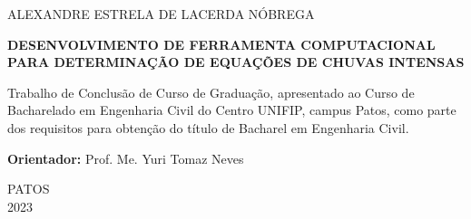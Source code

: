 \thispagestyle{empty}
	
	\begin{center}
		ALEXANDRE ESTRELA DE LACERDA NÓBREGA
	\end{center}
	
	\vspace{3.5cm}
	
	\begin{center}
		{\large \textbf{DESENVOLVIMENTO DE FERRAMENTA COMPUTACIONAL PARA DETERMINAÇÃO DE EQUAÇÕES DE CHUVAS INTENSAS}}
	\end{center}
	
	\vspace{4cm}
	
	\begin{quoting}[rightmargin=0cm,leftmargin=8cm]
 
        \noindent Trabalho de Conclusão de Curso de Graduação, apresentado ao Curso de Bacharelado em Engenharia Civil do Centro UNIFIP, campus Patos, como parte dos requisitos para obtenção do título de Bacharel em Engenharia Civil.
		
		\vspace{6pt}
		
		\noindent \textbf{Orientador:} Prof. Me. Yuri Tomaz Neves
		
		\vspace{6pt}
		

	\end{quoting}
	
	\vfill
	
	\begin{center}
		PATOS \\
			2023
	\end{center}
	\newpage
	